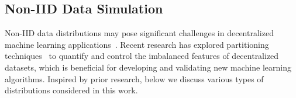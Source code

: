 \documentclass[conference]{IEEEtran}
\begin{document}










\subsection{Non-IID Data Simulation}

Non-IID data distributions may pose significant challenges in decentralized machine learning applications~\cite{HsiehNonIIDData2019}. Recent research has explored partitioning techniques~\cite{kairouz2021advances} to quantify and control the imbalanced features of decentralized datasets, which is beneficial for developing and validating new machine learning algorithms. Inspired by prior research, below we discuss various types of distributions considered in this work. 
\end{document}
